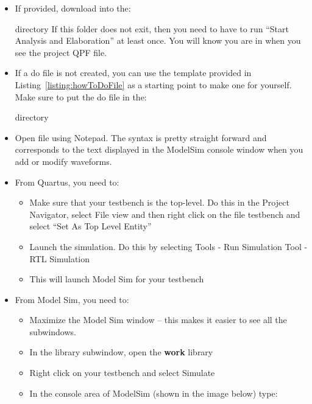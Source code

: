 \begin{itemize}
\item
  If provided, download   into the:
  
 directory
If this folder does not exit, then you need to have to run
``Start Analysis and Elaboration'' at least once. You will know you are in
 when you see the project QPF file. 

\item
  If a do file is not created, you can use the template provided in
  Listing~\ref{listing:howToDoFile} as a starting point to make one 
  for yourself. Make sure to put the do file in the:
  
   directory
\item
  Open  file using Notepad.
  The syntax is pretty straight forward and corresponds to the text
  displayed in the ModelSim console window when you add or modify
  waveforms.
\item
  From Quartus, you need to:

  \begin{itemize}
  \item
    Make sure that your testbench is the top-level. Do this in the
    Project Navigator, select File view and then right click on the file
    testbench and select ``Set As Top Level Entity''
  \item
    Launch the simulation. Do this by selecting Tools -\> Run Simulation Tool -\> RTL Simulation
  \item
    This will launch Model Sim for your testbench
  \end{itemize}
\item
  From Model Sim, you need to:

  \begin{itemize}
  \item
    Maximize the Model Sim window -- this makes it easier to see all the
    subwindows.
  \item
    In the library subwindow, open the \textbf{work} library
  \item
    Right click on your testbench and select Simulate
  \item
    In the console area of ModelSim (shown in the image below) type:
  \end{itemize}


\end{itemize}
